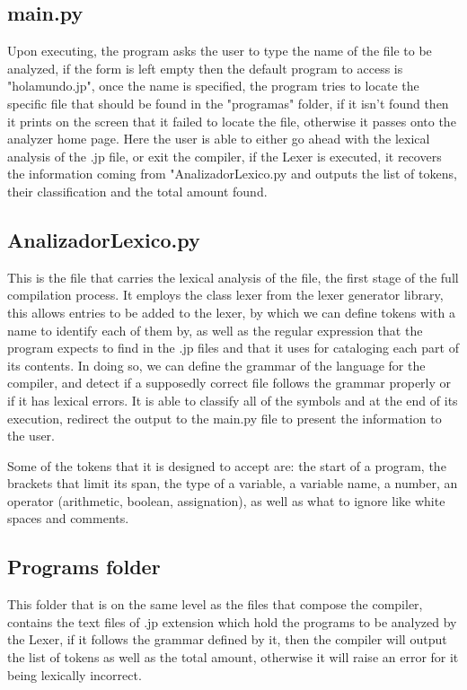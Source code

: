 \documentclass[letterpaper,12pt,oneside]{article}
\begin{document}
\subsection{main.py}
Upon executing, the program asks the user to type the name of the file to be analyzed, if the form is left empty then the default program to access is "holamundo.jp", once the name is specified, the program tries to locate the specific file that should be found in the "programas" folder, if it isn't found then it prints on the screen that it failed to locate the file, otherwise it passes onto the analyzer home page. Here the user is able to either go ahead with the lexical analysis of the .jp file, or exit the compiler, if the Lexer is executed, it recovers the information coming from "AnalizadorLexico.py and outputs the list of tokens, their classification and the total amount found.

\subsection{AnalizadorLexico.py}
This is the file that carries the lexical analysis of the file, the first stage of the full compilation process. It employs the class lexer from the lexer generator library, this allows entries to be added to the lexer, by which we can define tokens with a name to identify each of them by, as well as the regular expression that the program expects to find in the .jp files and that it uses for cataloging each part of its contents. In doing so, we can define the grammar of the language for the compiler, and detect if a supposedly correct file follows the grammar properly or if it has lexical errors. It is able to classify all of the symbols and at the end of its execution, redirect the output to the main.py file to present the information to the user. 

Some of the tokens that it is designed to accept are: the start of a program, the brackets that limit its span, the type of a variable, a variable name, a number, an operator (arithmetic, boolean, assignation), as well as what to ignore like white spaces and comments.

\subsection{Programs folder}
This folder that is on the same level as the files that compose the compiler, contains the text files of .jp extension which hold the programs to be analyzed by the Lexer, if it follows the grammar defined by it, then the compiler will output the list of tokens as well as the total amount, otherwise it will raise an error for it being lexically incorrect.
\end{document}
